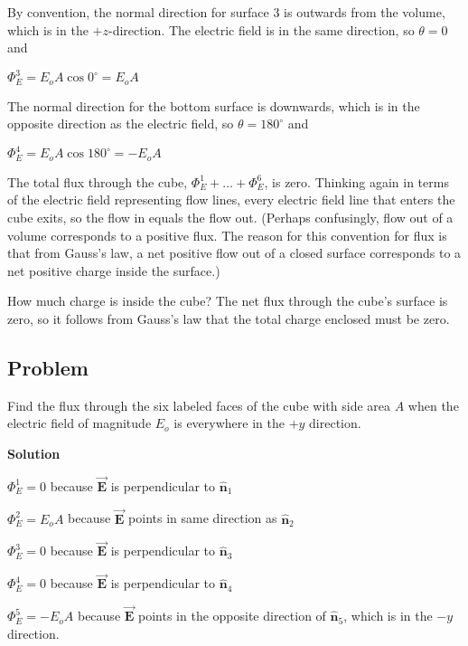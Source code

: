 \documentclass{article}
\newcommand{\bfvec}[1]{\vec{\mathbf{#1}}}
\begin{document}
By convention, the normal direction for surface 3 is outwards from the volume, which is in the $+z$-direction. The electric field is in the same direction, so $\theta=0$ and

$\Phi_E^{3}=E_oA\cos0^\circ=E_oA$

The normal direction for the bottom surface is downwards, which is in the opposite direction as the electric field, so $\theta=180^\circ$ and

$\Phi_E^{4}=E_oA\cos 180^\circ=-E_oA$

The total flux through the cube, $\Phi_E^1+…+\Phi_E^6$, is zero. Thinking again in terms of the electric field representing flow lines, every electric field line that enters the cube exits, so the flow in equals the flow out. (Perhaps confusingly, flow out of a volume corresponds to a positive flux. The reason for this convention for flux is that from Gauss's law, a net positive flow out of a closed surface corresponds to a net positive charge inside the surface.)

How much charge is inside the cube? The net flux through the cube's surface is zero, so it follows from Gauss's law that the total charge enclosed must be zero.

\ifsolutions

\else

\newpage
\fi
\ifsolutions\else
\newpage
\fi

\subsection{Problem}



Find the flux through the six labeled faces of the cube with side area $A$ when the electric field of magnitude $E_o$ is everywhere in the $+y$ direction.

\ifsolutions
\textbf{Solution}

$\Phi_E^1=0$ because $\bfvec{E}$ is perpendicular to $\hat{\mathbf{n}}_1$

$\Phi_E^2=E_oA$ because $\bfvec{E}$ points in same direction as $\hat{\mathbf{n}}_2$

$\Phi_E^3=0$ because $\bfvec{E}$ is perpendicular to $\hat{\mathbf{n}}_3$

$\Phi_E^4=0$ because $\bfvec{E}$ is perpendicular to $\hat{\mathbf{n}}_4$

$\Phi_E^5=-E_oA$ because $\bfvec{E}$ points in the opposite direction of $\hat{\mathbf{n}}_5$, which is in the $-y$ direction.
\end{document}
